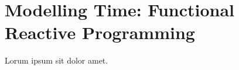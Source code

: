 \section{Modelling Time: Functional Reactive Programming}


Lorum ipsum sit dolor amet.  \lipsum[2-4]